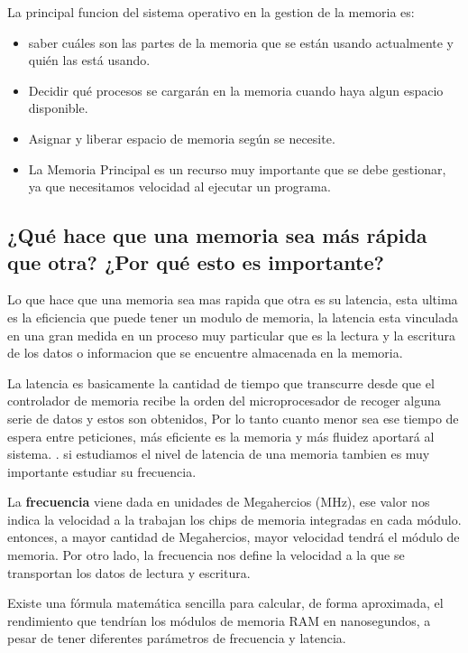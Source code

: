 \documentclass{article}
\begin{document}
\noindent
La principal funcion del sistema operativo en la gestion de la memoria es:
\begin{itemize}
\item saber cuáles son las partes de la memoria que se están usando actualmente y quién las está usando.
\item Decidir qué procesos se cargarán en la memoria cuando haya algun espacio disponible.
\item Asignar y liberar espacio de memoria según se necesite.
\item La Memoria Principal es un recurso muy importante que se debe gestionar, ya que necesitamos velocidad al ejecutar un programa.
\cite{sites.google}

\end{itemize}

\subsection{¿Qué hace que una memoria sea más rápida que otra? ¿Por qué esto es importante?}
\noindent
Lo que hace que una memoria sea mas rapida que otra es su latencia, esta ultima es la eficiencia que puede tener un modulo de memoria, la latencia esta vinculada en una gran medida en un proceso muy particular que es la lectura y la escritura de los datos o informacion que se encuentre almacenada en la memoria.

\vspace{0.3cm}
\noindent
La latencia es basicamente la cantidad de tiempo que transcurre desde que el controlador de memoria recibe la orden del microprocesador de recoger alguna serie de datos y estos son obtenidos, Por lo tanto cuanto menor sea ese tiempo de espera entre peticiones, más eficiente es la memoria y más fluidez aportará al sistema. \cite{computerhoy}. 
si estudiamos el nivel de latencia de una memoria tambien es muy importante estudiar su frecuencia.

\vspace{0.3cm}
\noindent
La \textbf{frecuencia} viene dada en unidades de Megahercios (MHz), ese valor nos indica la velocidad a la trabajan los chips de memoria integradas en cada módulo. entonces, a mayor cantidad de Megahercios, mayor velocidad tendrá el módulo de memoria. Por otro lado, la frecuencia nos define la velocidad a la que se transportan los datos de lectura y escritura. 


\vspace{0.3cm}
\noindent
Existe una fórmula matemática sencilla para calcular, de forma aproximada, el rendimiento que tendrían los módulos de memoria RAM en nanosegundos, a pesar de tener diferentes parámetros de frecuencia y latencia.\cite{computerhoy}
\end{document}
